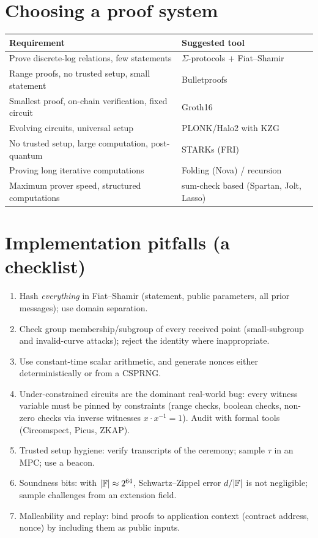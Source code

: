 \documentclass[11pt,a4paper]{report}
\theoremstyle{plain}
\theoremstyle{definition}
\theoremstyle{remark}
\begin{document}
\section{Choosing a proof system}
\begin{center}\small
\begin{tabular}{@{}L{4.0cm}L{9.6cm}@{}}\toprule
Requirement & Suggested tool\\\midrule
Prove discrete-log relations, few statements & $\Sigma$-protocols + Fiat--Shamir\\
Range proofs, no trusted setup, small statement & Bulletproofs\\
Smallest proof, on-chain verification, fixed circuit & Groth16\\
Evolving circuits, universal setup & PLONK/Halo2 with KZG\\
No trusted setup, large computation, post-quantum & STARKs (FRI)\\
Proving long iterative computations & Folding (Nova) / recursion\\
Maximum prover speed, structured computations & sum-check based (Spartan, Jolt, Lasso) \\\bottomrule
\end{tabular}
\end{center}

\section{Implementation pitfalls (a checklist)}
\begin{enumerate}
\item Hash \emph{everything} in Fiat--Shamir (statement, public parameters, all prior messages); use domain separation.
\item Check group membership/subgroup of every received point (small-subgroup and invalid-curve attacks); reject the identity where inappropriate.
\item Use constant-time scalar arithmetic, and generate nonces either deterministically or from a CSPRNG.
\item Under-constrained circuits are the dominant real-world bug: every witness variable must be pinned by constraints (range checks, boolean checks, non-zero checks via inverse witnesses $x\cdot x^{-1}=1$). Audit with formal tools (Circomspect, Picus, ZKAP).
\item Trusted setup hygiene: verify transcripts of the ceremony; sample $\tau$ in an MPC; use a beacon.
\item Soundness bits: with $|\mathbb{F}|\approx2^{64}$, Schwartz--Zippel error $d/|\mathbb{F}|$ is not negligible; sample challenges from an extension field.
\item Malleability and replay: bind proofs to application context (contract address, nonce) by including them as public inputs.
\end{enumerate}
\end{document}
